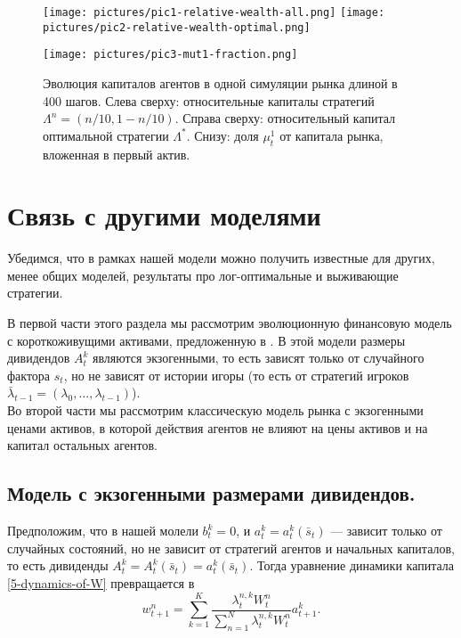 \documentclass[a4paper,12pt,russian]{article} %
\theoremstyle{definition}
\begin{document}
\begin{figure}
\centering
\texttt{[image: pictures/pic1-relative-wealth-all.png]}\quad
\texttt{[image: pictures/pic2-relative-wealth-optimal.png]}\par
\texttt{[image: pictures/pic3-mut1-fraction.png]}

\caption{\label{fig1} Эволюция капиталов агентов в одной симуляции рынка длиной в 400 шагов.
Слева сверху: относительные капиталы стратегий $\Lambda^n=(n/10, 1-n/10)$.
Справа сверху: относительный капитал оптимальной стратегии $\Lambda^*$.
Снизу: доля $\mu_{t}^1$ от капитала рынка, вложенная в первый актив.}
\end{figure}










\section{Связь с другими моделями}
\label{section5-relation-to-other-models}
Убедимся, что в рамках нашей модели можно получить известные для других, менее общих моделей, результаты про лог-оптимальные и выживающие стратегии.

В первой части этого раздела мы рассмотрим эволюционную финансовую модель с короткоживущими активами, предложенную в \cite{Amir2013}. В этой модели размеры дивидендов $A_t^k$ являются экзогенными, то есть зависят только от случайного фактора $s_t$, но не зависят от истории игоры (то есть от стратегий игроков $\bar\lambda_{t-1} =(\lambda_0, \dots, \lambda_{t-1})$).\\

Во второй части мы рассмотрим классическую модель рынка с экзогенными ценами активов, в которой действия агентов не влияют на цены активов и на капитал остальных агентов.


\subsection{ Модель с экзогенными размерами дивидендов.} 


Предположим, что в нашей молели $b_t^k=0$, и $a_t^k=a_t^k(\bar s_t)$ — зависит только от случайных состояний, но не зависит от стратегий агентов и начальных капиталов, то есть дивиденды $A_t^k=A_t^k(\bar s_t) = a_t^k(\bar s_t)$. Тогда уравнение динамики капитала \eqref{5-dynamics-of-W} превращается в 
\[
w_{t+1}^n = \sum_{k=1}^K 
\frac{\lambda_{t}^{n,k} W_t^n}{\sum_{n=1}^N \lambda_{t}^{n,k} W_t^n} a_{t+1}^k.
\]
\end{document}

